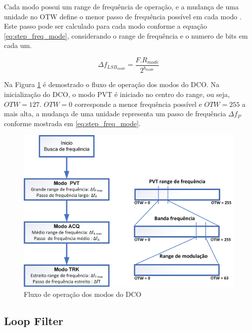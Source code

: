 Cada modo possui um range de frequência de operação, e a mudança de uma unidade no OTW define o menor passo de frequência possível em cada modo . Este passo pode ser calculado para cada modo conforme a equação \ref{eq:step_freq_mode}, considerando o range de frequência e o numero de bits em cada um. 

\begin{equation}
	\Delta f_{LSB_{mode}} = \frac{F.R_{mode}}{2^{b_{mode}}}
	\label{eq:step_freq_mode}
\end{equation}


Na Figura \ref{fig:bank_modos} é demostrado o fluxo de operação dos modos do DCO. Na inicialização do DCO,  o modo PVT é iniciado no centro do range, ou seja, $OTW=127$. $OTW=0$ corresponde a menor frequência possível e $OTW=255$ a mais alta, a mudança de uma unidade representa um passo de frequência $\Delta f_P$ conforme mostrada em \ref{eq:step_freq_mode}.


\begin{figure}[h!]
	\caption{Fluxo de operação dos modos do DCO }
	\begin{center}
		\includegraphics[scale=0.6]{img/bank_modos.png}
	\end{center}
	\label{fig:bank_modos}
\end{figure}

\subsection{Loop Filter}

